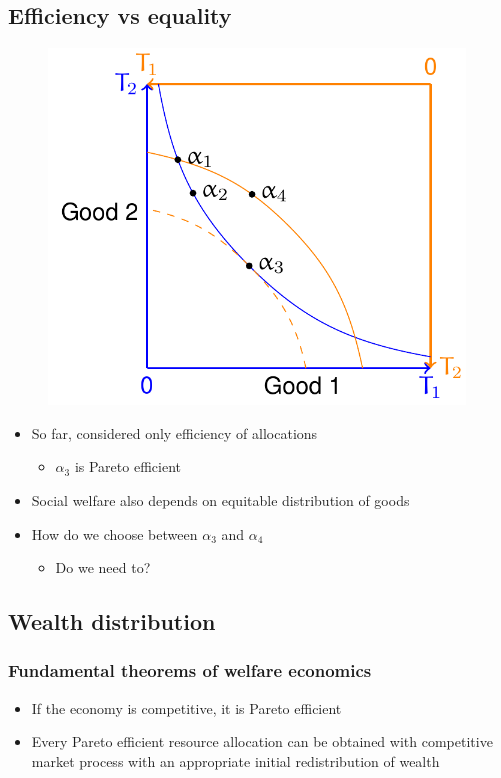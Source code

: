 \subsection{Efficiency vs equality}
\begin{figure}[H]
  \centering
  \includegraphics[width =0.5 \textwidth]{./img/figure11.png}
  \caption{}
\end{figure}
\begin{itemize}
  \item So far, considered only efficiency of allocations
        \begin{itemize}
          \item $\alpha_3$ is Pareto efficient
        \end{itemize}
  \item Social welfare also depends on equitable distribution of goods
  \item How do we choose between $\alpha_3$ and $\alpha_4$
        \begin{itemize}
          \item Do we need to?
        \end{itemize}
\end{itemize}
\subsection{Wealth distribution}
\subsubsection{Fundamental theorems of welfare economics}
\begin{itemize}
  \item If the economy is competitive, it is Pareto efficient
  \item Every Pareto efficient resource allocation can be obtained with competitive market process with an appropriate initial redistribution of wealth
\end{itemize}
